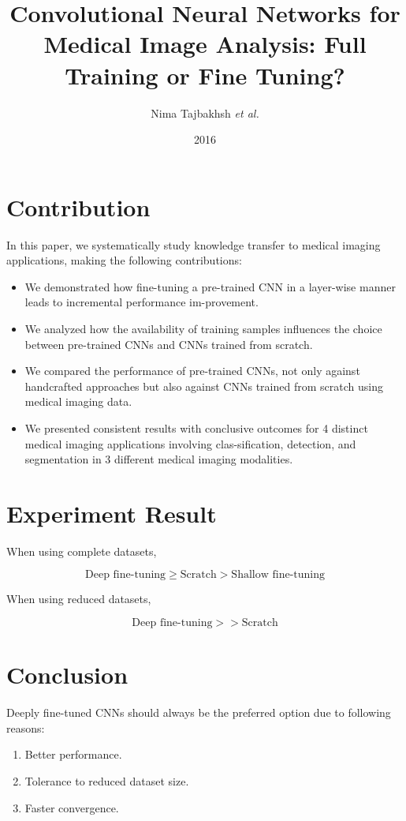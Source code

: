 \documentclass[a4paper,12pt]{article}
\title{Convolutional Neural Networks for Medical Image Analysis: Full Training or Fine Tuning?}
\author{Nima Tajbakhsh \emph{et al.}}
\date{2016}
\begin{document}
\maketitle

\section{Contribution}

In this paper, we systematically study knowledge transfer to medical imaging applications, making the following contributions:

\begin{itemize}
	\item We demonstrated how fine-tuning a pre-trained CNN in a layer-wise manner leads to incremental performance im-provement.
	\item We analyzed how the availability of training samples influences the choice between pre-trained CNNs and CNNs trained from scratch.
	\item We compared the performance of pre-trained CNNs, not only against handcrafted approaches but also against CNNs trained from scratch using medical imaging data.
	\item We presented consistent results with conclusive outcomes for 4 distinct medical imaging applications involving clas-sification, detection, and segmentation in 3 different medical imaging modalities.
\end{itemize}

\section{Experiment Result}

When using complete datasets,

\[\textrm{Deep fine-tuning} \ge \textrm{Scratch} > \textrm{Shallow fine-tuning}\]

When using reduced datasets,

\[\textrm{Deep fine-tuning} >> \textrm{Scratch}\]

\section{Conclusion}

Deeply fine-tuned CNNs should always be the preferred option due to following reasons:

\begin{enumerate}
	\item Better performance.
	\item Tolerance to reduced dataset size.
	\item Faster convergence.
\end{enumerate}
\end{document}
